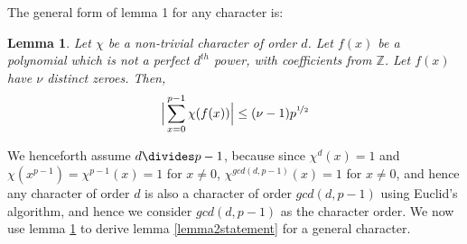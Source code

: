 \documentclass{report}
\newtheorem{lemma}{Lemma}
\begin{document}
The general form of lemma 1 for any character is:
\begin{lemma} \label{lemma4}
\cite{schmidt}Let $\chi$ be a non-trivial character of order $d$. Let $f(x)$ be a polynomial which is not a perfect $d^{th}$ power, with coefficients from $\mathbb{Z}$. Let $f(x)$ have $\nu$ distinct zeroes. Then,
$$\Big\lvert\sum\limits_{x=0}^{p-1}\chi(f(x))\Big\rvert\leq (\nu -1)p^{\nicefrac{1}{2}}$$
\end{lemma}
We henceforth assume $d \divides p-1$, because since $\chi^{d}(x)=1$ and $\chi(x^{p-1})=\chi^{p-1}(x)=1$ for $x\neq0$, $\chi^{gcd(d,p-1)}(x)=1$ for $x\neq0$, and hence any character of order $d$ is also a character of order $gcd(d,p-1)$ using Euclid's algorithm, and hence we consider $gcd(d,p-1)$ as the character order.
We now use lemma \ref{lemma4} to derive lemma \ref{lemma2statement} for a general character.
\end{document}
